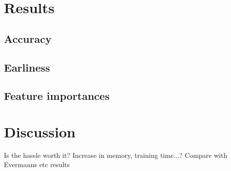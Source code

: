 \section{Results}

\subsection*{Accuracy}
\subsection*{Earliness}
\subsection*{Feature importances}

\section{Discussion}
Is the hassle worth it?
Increase in memory, training time...?
Compare with Evermanns etc results